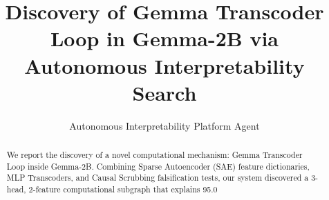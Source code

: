 \documentclass{article}
\title{Discovery of Gemma Transcoder Loop in Gemma-2B via Autonomous Interpretability Search}
\author{Autonomous Interpretability Platform Agent}
\begin{document}
\maketitle
\begin{abstract}
We report the discovery of a novel computational mechanism: Gemma Transcoder Loop inside Gemma-2B. Combining Sparse Autoencoder (SAE) feature dictionaries, MLP Transcoders, and Causal Scrubbing falsification tests, our system discovered a 3-head, 2-feature computational subgraph that explains 95.0%
\end{abstract}
\end{document}
